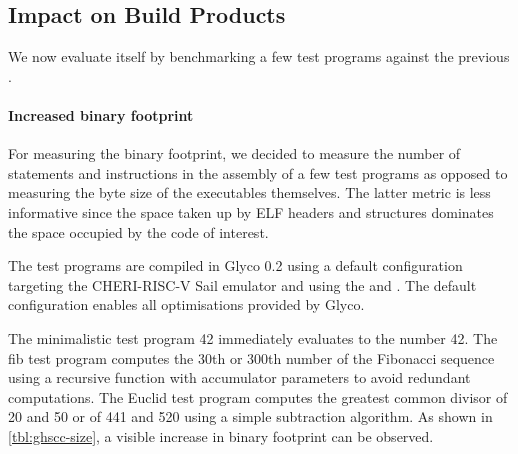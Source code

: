 \documentclass[main.tex]{subfiles}
\begin{document}

\subsection{Impact on Build Products}
We now evaluate  itself by benchmarking a few test programs against the previous .

\paragraph{Increased binary footprint} For measuring the binary footprint, we decided to measure the number of statements and instructions in the assembly of a few test programs as opposed to measuring the byte size of the executables themselves. The latter metric is less informative since the space taken up by ELF headers and structures dominates the space occupied by the code of interest.

The test programs are compiled in Glyco 0.2 using a default configuration targeting the CHERI-RISC-V Sail emulator and using the  and  . The default configuration enables all optimisations provided by Glyco.

The minimalistic test program 42 immediately evaluates to the number 42. The fib test program computes the 30th or 300th number of the Fibonacci sequence using a recursive function with accumulator parameters to avoid redundant computations. The Euclid test program computes the greatest common divisor of 20 and 50 or of 441 and 520 using a simple subtraction algorithm. As shown in \cref{tbl:ghscc-size}, a visible increase in binary footprint can be observed.
\end{document}
